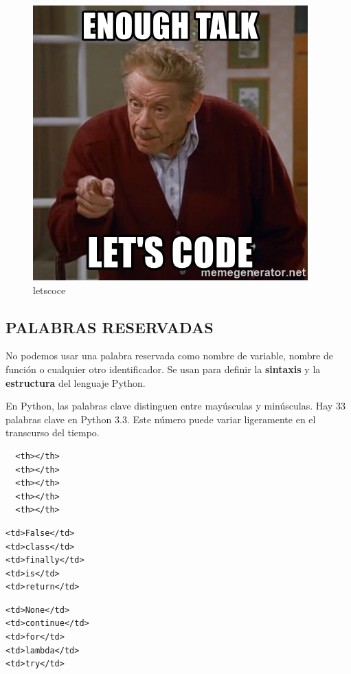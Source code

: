 \documentclass[11pt]{article}
\makeatletter
\def\maxwidth{\ifdim\Gin@nat@width>\linewidth\linewidth
    \else\Gin@nat@width\fi}
\let\Oldincludegraphics\includegraphics
\renewcommand{\includegraphics}[1]{\Oldincludegraphics[width=.8\maxwidth]{#1}}
\makeatother
\begin{document}
    \begin{figure}
\centering
\includegraphics{img/enough-talk-lets-code.jpg}
\caption{letscoce}
\end{figure}

    \subsection{PALABRAS RESERVADAS}\label{palabras-reservadas}

No podemos usar una palabra reservada como nombre de variable, nombre de
función o cualquier otro identificador. Se usan para definir la
\textbf{sintaxis} y la \textbf{estructura} del lenguaje Python.

En Python, las palabras clave distinguen entre mayúsculas y minúsculas.
Hay 33 palabras clave en Python 3.3. Este número puede variar
ligeramente en el transcurso del tiempo.

\begin{verbatim}
  <th></th>
  <th></th>
  <th></th>
  <th></th>
  <th></th>
\end{verbatim}

\begin{verbatim}
<td>False</td>
<td>class</td> 
<td>finally</td>
<td>is</td>
<td>return</td>
\end{verbatim}

\begin{verbatim}
<td>None</td>
<td>continue</td> 
<td>for</td>
<td>lambda</td>
<td>try</td>
\end{verbatim}
\end{document}
